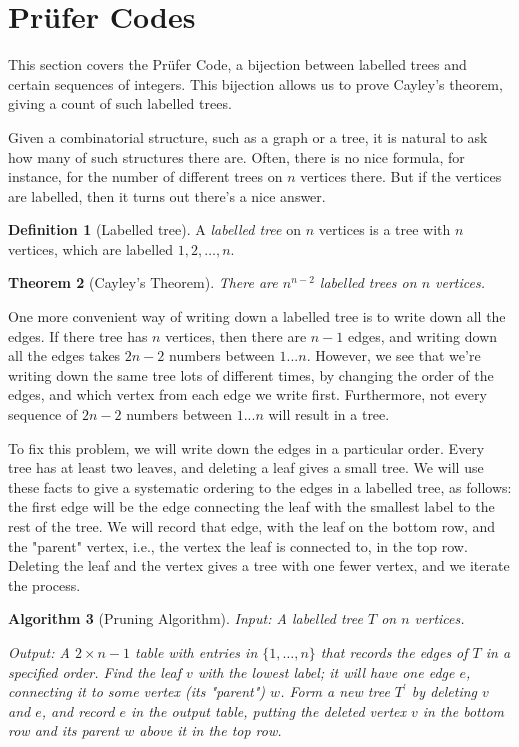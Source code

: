 \documentclass[10pt,]{book}
\theoremstyle{plain}
\newtheorem{theorem}{Theorem}[section]
\newtheorem{algorithm}[theorem]{Algorithm}
\theoremstyle{definition}
\newtheorem{definition}[theorem]{Definition}
\theoremstyle{definition}
\theoremstyle{definition}
\theoremstyle{definition}
\numberwithin{equation}{section}
\begin{document}
\section[{Prüfer Codes}]{Prüfer Codes}\label{s_graphalgorithms_prufer}
\hypertarget{p-233}{}%
This section covers the Prüfer Code, a bijection between labelled trees and certain sequences of integers. This bijection allows us to prove Cayley's theorem, giving a count of such labelled trees.%
\par
\hypertarget{p-234}{}%
Given a combinatorial structure, such as a graph or a tree, it is natural to ask how many of such structures there are.  Often, there is no nice formula, for instance, for the number of different trees on \(n\) vertices there.  But if the vertices are labelled, then it turns out there's a nice answer.%
\begin{definition}[{Labelled tree}]\label{definition-18}
\hypertarget{p-235}{}%
A \emph{labelled tree} on \(n\) vertices is a tree with \(n\) vertices, which are labelled \(1,2,\dots,n.\)%
\end{definition}
\begin{theorem}[{Cayley's Theorem}]\label{theorem-5}
\hypertarget{p-236}{}%
There are \(n^{n-2}\) labelled trees on \(n\) vertices.%
\end{theorem}
\hypertarget{p-237}{}%
One more convenient way of writing down a labelled tree is to write down all the edges.  If there tree has \(n\) vertices, then there are \(n-1\) edges, and writing down all the edges takes \(2n-2\) numbers between \(1...n\).  However, we see that we're writing down the same tree lots of different times, by changing the order of the edges, and which vertex from each edge we write first.  Furthermore, not every sequence of \(2n-2\) numbers between \(1...n\) will result in a tree.%
\par
\hypertarget{p-238}{}%
To fix this problem, we will write down the edges in a particular order.  Every tree has at least two leaves, and deleting a leaf gives a small tree.  We will use these facts to give a systematic ordering to the edges in a labelled tree, as follows: the first edge will be the edge connecting the leaf with the smallest label to the rest of the tree.  We will record that edge, with the leaf on the bottom row, and the "parent" vertex, i.e., the vertex the leaf is connected to, in the top row.  Deleting the leaf and the vertex gives a tree with one fewer vertex, and we iterate the process.%
\begin{algorithm}[{Pruning Algorithm}]\label{algorithm-4}
\hypertarget{p-239}{}%
Input:  A labelled tree \(T\) on \(n\) vertices.%
\par
\hypertarget{p-240}{}%
Output: A \(2\times n-1\) table with entries in \(\{1,\dots,n\}\) that records the edges of \(T\) in a specified order.%
\hypertarget{p-241}{}%
Find the leaf \(v\) with the lowest label; it will have one edge \(e\), connecting it to some vertex (its "parent") \(w\).   Form a new tree \(T^\prime\) by deleting \(v\) and \(e\), and record \(e\) in the output table, putting the deleted vertex \(v\) in the bottom row and its parent \(w\) above it in the top row.%
\end{algorithm}
\end{document}
